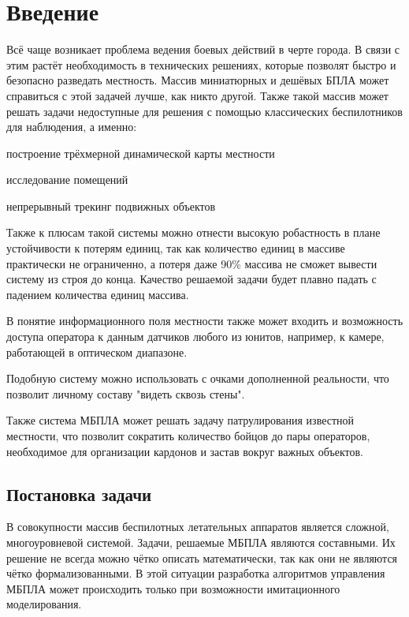\section{Введение}

Всё чаще возникает проблема ведения боевых действий
в черте города. В связи с этим растёт необходимость в технических
решениях, которые позволят быстро и безопасно разведать местность.
Массив миниатюрных и дешёвых БПЛА может справиться с этой задачей 
лучше, как никто другой. Также такой массив может решать задачи недоступные
для решения с помощью классических беспилотников для наблюдения, а именно: 
\begin{mintemize}
    \item построение трёхмерной динамической карты местности
    \item исследование помещений
    \item непрерывный трекинг подвижных объектов
\end{mintemize}

Также к плюсам такой системы можно отнести высокую робастность в плане
устойчивости к потерям единиц, так как количество единиц в массиве
практически не ограниченно, а потеря даже 90\% массива не сможет
вывести систему из строя до конца. Качество решаемой задачи
будет плавно падать с падением количества единиц массива.

В понятие информационного поля местности также может входить
и возможность доступа оператора к данным датчиков любого из юнитов, например,
к камере, работающей в оптическом диапазоне.

Подобную систему можно использовать с очками дополненной реальности,
что позволит личному составу "видеть сквозь стены".

Также система МБПЛА может решать задачу патрулирования известной местности,
что позволит сократить количество бойцов до пары операторов, необходимое
для организации кардонов и застав вокруг важных объектов.

\subsection{Постановка задачи}

В совокупности массив беспилотных летательных аппаратов является сложной,
многоуровневой системой. Задачи, решаемые МБПЛА являются составными.
Их решение не всегда можно чётко описать математически, так как они не
являются чётко формализованными.  В этой ситуации разработка алгоритмов
управления МБПЛА может происходить только при возможности имитационного
моделирования.

